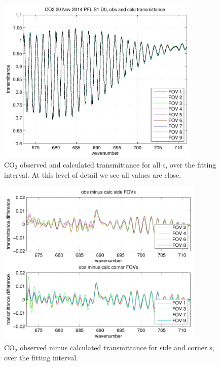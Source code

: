 \documentclass[12pt]{article}
\begin{document}
\begin{figure}
  \centering
  \includegraphics[height=8cm]{figures/CO2_obs_and_calc.pdf}
  \caption{CO$_2$ observed and calculated transmittance for all
    {\fov}s, over the fitting interval.  At this level of detail we
    see all values are close.}
\end{figure}


\begin{figure}
  \centering
  \includegraphics[height=8cm]{figures/CO2_breakout_2.pdf}
  \caption{CO$_2$ observed minus calculated transmittance for side
    and corner {\fov}s, over the fitting interval.}
\end{figure}

\end{document}
